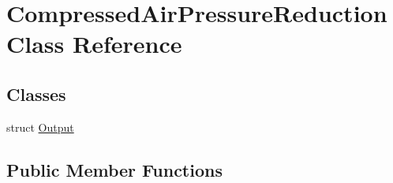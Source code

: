 \hypertarget{class_compressed_air_pressure_reduction}{}\section{Compressed\+Air\+Pressure\+Reduction Class Reference}
\label{class_compressed_air_pressure_reduction}
\subsection*{Classes}
\begin{DoxyCompactItemize}
\item 
struct \hyperlink{struct_compressed_air_pressure_reduction_1_1_output}{Output}
\end{DoxyCompactItemize}
\subsection*{Public Member Functions}
